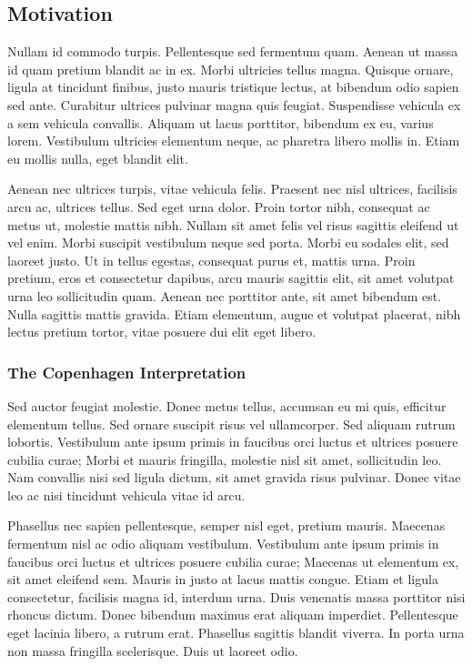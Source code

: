 \subsection{Motivation}

Nullam id commodo turpis. Pellentesque sed fermentum quam. Aenean ut massa id quam pretium blandit ac in ex. Morbi ultricies tellus magna. Quisque ornare, ligula at tincidunt finibus, justo mauris tristique lectus, at bibendum odio sapien sed ante. Curabitur ultrices pulvinar magna quis feugiat. Suspendisse vehicula ex a sem vehicula convallis. Aliquam ut lacus porttitor, bibendum ex eu, varius lorem. Vestibulum ultricies elementum neque, ac pharetra libero mollis in. Etiam eu mollis nulla, eget blandit elit.

Aenean nec ultrices turpis, vitae vehicula felis. Praesent nec nisl ultrices, facilisis arcu ac, ultrices tellus. Sed eget urna dolor. Proin tortor nibh, consequat ac metus ut, molestie mattis nibh. Nullam sit amet felis vel risus sagittis eleifend ut vel enim. Morbi suscipit vestibulum neque sed porta. Morbi eu sodales elit, sed laoreet justo. Ut in tellus egestas, consequat purus et, mattis urna. Proin pretium, eros et consectetur dapibus, arcu mauris sagittis elit, sit amet volutpat urna leo sollicitudin quam. Aenean nec porttitor ante, sit amet bibendum est. Nulla sagittis mattis gravida. Etiam elementum, augue et volutpat placerat, nibh lectus pretium tortor, vitae posuere dui elit eget libero.

\subsubsection{The Copenhagen Interpretation}

Sed auctor feugiat molestie. Donec metus tellus, accumsan eu mi quis, efficitur elementum tellus. Sed ornare suscipit risus vel ullamcorper. Sed aliquam rutrum lobortis. Vestibulum ante ipsum primis in faucibus orci luctus et ultrices posuere cubilia curae; Morbi et mauris fringilla, molestie nisl sit amet, sollicitudin leo. Nam convallis nisi sed ligula dictum, sit amet gravida risus pulvinar. Donec vitae leo ac nisi tincidunt vehicula vitae id arcu.

Phasellus nec sapien pellentesque, semper nisl eget, pretium mauris. Maecenas fermentum nisl ac odio aliquam vestibulum. Vestibulum ante ipsum primis in faucibus orci luctus et ultrices posuere cubilia curae; Maecenas ut elementum ex, sit amet eleifend sem. Mauris in justo at lacus mattis congue. Etiam et ligula consectetur, facilisis magna id, interdum urna. Duis venenatis massa porttitor nisi rhoncus dictum. Donec bibendum maximus erat aliquam imperdiet. Pellentesque eget lacinia libero, a rutrum erat. Phasellus sagittis blandit viverra. In porta urna non massa fringilla scelerisque. Duis ut laoreet odio.

